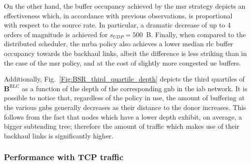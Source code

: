On the other hand, the buffer occupancy achieved by the \gls{msr} strategy depicts an effectiveness which, in accordance with previous observations, is proportional with respect to the source rate. In particular, a dramatic decrease of up to 4 orders of magnitude is achieved for $s_{UDP} = 500$~B.
Finally, when compared to the distributed scheduler, the \gls{mrba} policy also achieves a lower median \gls{rlc} buffer occupancy towards the backhaul links, albeit the difference is less striking than in the case of the \gls{msr} policy, and at the cost of slightly more congested \gls{ue} buffers. 

Additionally, Fig.~\ref{Fig:BSR_third_quartile_depth} depicts the third quartiles of $\mathbf{B}^{\mathrm{RLC}}$ as a function of the depth of the corresponding \gls{gnb} in the \gls{iab} network. It is possible to notice that, regardless of the policy in use, the amount of buffering at the various \glspl{gnb} generally decreases as their distance to the donor increases. This follows from the fact that nodes which have a lower depth exhibit, on average, a bigger subtending tree; therefore the amount of traffic which makes use of their backhaul links is significantly higher.




\subsubsection{Performance with TCP traffic}

